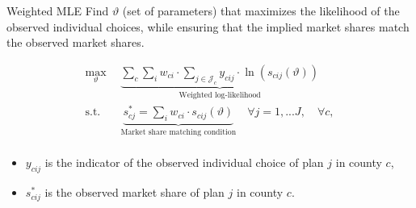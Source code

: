 \documentclass[professionalfonts, aspectratio=169]{beamer}
\begin{document}
  \begin{frame}{Weighted MLE}
    Find $\vartheta$ (set of parameters) that maximizes the likelihood of the observed individual choices, while ensuring that the implied market shares match the observed market shares.
  
    \begin{equation}
      \begin{aligned}
          \max_\vartheta
                              & \underbrace{\sum_{c} \sum_i w_{ci} \cdot \sum_{j\in \mathcal{J}_c}
              y_{cij} \cdot \ln(s_{cij} (\vartheta ))}
          _{\text{Weighted log-likelihood}}                                                        \\
          \textrm{s.t.} \quad & \underbrace{{s_{cj}^*} =
              \sum_i w_{ci} \cdot s_{cij} (\vartheta )}_{\text{Market share matching condition}}
          \quad \forall j = 1, ...J, \quad \forall c,                                              \\
      \end{aligned}
  \end{equation}
  \begin{itemize}\small
    \item $y_{cij}$ is the indicator of the observed individual choice of plan $j$ in county $c$,
    \item $s_{cij}^*$ is the observed market share of plan $j$ in county $c$.
  \end{itemize}
    
  \end{frame}
\end{document}
